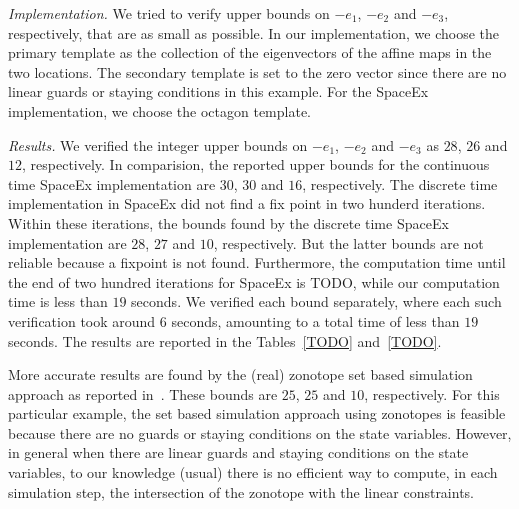\emph{Implementation.}  We tried to verify upper
bounds on $-e_1$, $-e_2$ and $-e_3$, respectively, that are as small
as possible.  In our implementation, we choose the primary
template as the collection of the eigenvectors of the affine maps in
the two locations.  The secondary template is set to the zero vector
since there are no linear guards or staying conditions in this
example.  For the SpaceEx implementation, we choose the octagon
template.

\emph{Results.}  We verified the integer upper bounds on $-e_1$,
$-e_2$ and $-e_3$ as $28$, $26$ and $12$, respectively.  In
comparision, the reported upper bounds for the continuous time SpaceEx
implementation are $30$, $30$ and $16$, respectively.  The discrete
time implementation in SpaceEx did not find a fix point in two hunderd
iterations.  Within these iterations, the bounds found by the discrete
time SpaceEx implementation are $28$, $27$ and $10$, respectively.
But the latter bounds are not reliable because a fixpoint is not
found.  Furthermore, the computation time until the end of two hundred
iterations for SpaceEx is TODO, while our computation time is less
than $19$ seconds.  We verified each bound separately, where each such
verification took around $6$ seconds, amounting to a total time of
less than $19$ seconds.  The results are reported in the
Tables~\ref{TODO} and~\ref{TODO}.

More accurate results are found by the (real) zonotope set based
simulation approach as reported in~\cite{TODO}.  These bounds are
$25$, $25$ and $10$, respectively.  For this particular example, the
set based simulation approach using zonotopes is feasible because
there are no guards or staying conditions on the state variables.
However, in general when there are linear guards and staying
conditions on the state variables, to our knowledge (usual) there is
no efficient way to compute, in each simulation step, the intersection
of the zonotope with the linear constraints.



